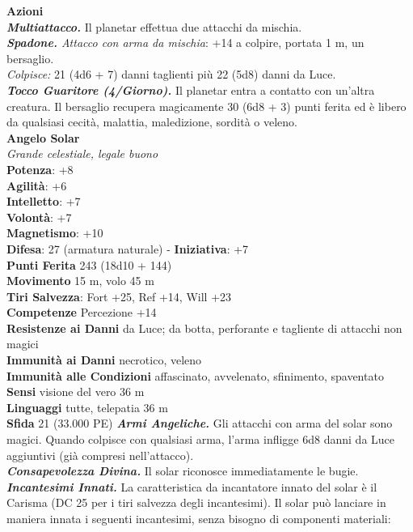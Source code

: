 \begin{multicols}{2}
\smallskip\textbf{Azioni}\\
\emph{\textbf{Multiattacco.}} Il planetar effettua due attacchi da mischia.\\
\emph{\textbf{Spadone.} Attacco con arma da mischia}: +14 a colpire, portata 1 m, un bersaglio.\\
\emph{Colpisce:} 21 (4d6 + 7) danni taglienti più 22 (5d8) danni da Luce.\\
\emph{\textbf{Tocco Guaritore (4/Giorno).}} Il planetar entra a contatto con un'altra creatura. Il bersaglio recupera magicamente 30 (6d8 + 3) punti ferita ed è libero da qualsiasi cecità, malattia, maledizione, sordità o veleno.\\

\medskip\textbf{Angelo Solar}\\
\emph{Grande celestiale, legale buono}\\
\textbf{Potenza}: +8\\
\textbf{Agilità}: +6\\
\textbf{Intelletto}: +7\\
\textbf{Volontà}: +7\\
\textbf{Magnetismo}: +10\\
\textbf{Difesa}: 27 (armatura naturale) - \textbf{Iniziativa}: +7\\
\textbf{Punti Ferita} 243 (18d10 + 144)\\
\textbf{Movimento} 15 m, volo 45 m\\
\textbf{Tiri Salvezza}: Fort +25, Ref +14, Will +23\\
\textbf{Competenze} Percezione +14\\
\textbf{Resistenze ai Danni} da Luce; da botta, perforante e tagliente di attacchi non magici\\
\textbf{Immunità ai Danni} necrotico, veleno\\
\textbf{Immunità alle Condizioni} affascinato, avvelenato, sfinimento, spaventato\\
\textbf{Sensi} visione del vero 36 m\\
\textbf{Linguaggi} tutte, telepatia 36 m\\
\textbf{Sfida} 21 (33.000 PE)\smallskip
\emph{\textbf{Armi Angeliche.}} Gli attacchi con arma del solar sono magici. Quando colpisce con qualsiasi arma, l'arma infligge 6d8 danni da Luce aggiuntivi (già compresi nell'attacco).\\
\emph{\textbf{Consapevolezza Divina.}} Il solar riconosce immediatamente le bugie.\\
\emph{\textbf{Incantesimi Innati.}} La caratteristica da incantatore innato del solar è il Carisma (DC 25 per i tiri salvezza degli incantesimi). Il solar può lanciare in maniera innata i seguenti incantesimi, senza bisogno di componenti materiali:\\

\end{multicols}
